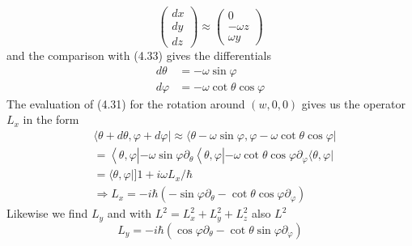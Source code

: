 \begin{equation}
\left(\begin{array}{l}{d x} \\ {d y} \\ {d z}\end{array}\right) \approx\left(\begin{array}{c}{0} \\ {-\omega z} \\ {\omega y}\end{array}\right)
\end{equation}
and the comparison with (4.33) gives the differentials
\begin{equation}
\begin{aligned} d \theta &=-\omega \sin \varphi \\ d \varphi &=-\omega \cot \theta \cos \varphi \end{aligned}
\end{equation}
The evaluation of (4.31) for the rotation around $(w, 0, 0)$ gives us the operator $L_x$ in the form
\begin{equation}
\begin{aligned}
    &\langle\theta+ d \theta, \varphi+d \varphi|  \approx\langle\theta-\omega \sin \varphi, \varphi-\omega \cot \theta \cos \varphi| \\
    &=\left\langle\theta, \varphi\left|-\omega \sin \varphi \partial_{\theta}\left\langle\theta, \varphi\left|-\omega \cot \theta \cos \varphi \partial_{\varphi}\langle\theta, \varphi|\right.\right.\right.\right.\\
    &=\langle\theta, \varphi|] 1+i \omega L_{x} / \hbar \\ 
    &\Rightarrow L_{x}=-i \hbar\left(-\sin \varphi \partial_{\theta}-\cot \theta \cos \varphi \partial_{\varphi}\right) 
\end{aligned}
\end{equation}
Likewise we find $L_y$ and with $L^2 = L^2_x + L^2_y + L^2_z$ also $L^2$
\begin{equation}
    L_{y} =-i \hbar(\cos \varphi \partial_{\theta}-\cot \theta \sin \varphi \partial_{\varphi}) 
\end{equation}

